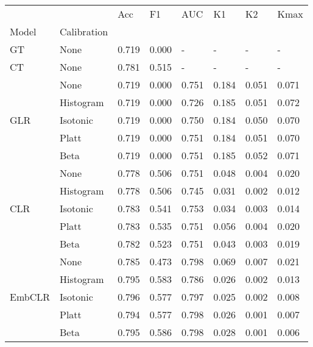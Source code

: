 \begin{tabular}{llllllll}
\toprule
 &  & Acc & F1 & AUC & K1 & K2 & Kmax \\
Model & Calibration &  &  &  &  &  &  \\
\midrule
GT & None & 0.719 & 0.000 & - & - & - & - \\
\cline{1-8}
CT & None & 0.781 & 0.515 & - & - & - & - \\
\cline{1-8}
\multirow[t]{5}{*}{GLR} & None & 0.719 & 0.000 & 0.751 & 0.184 & 0.051 & 0.071 \\
 & Histogram & 0.719 & 0.000 & 0.726 & 0.185 & 0.051 & 0.072 \\
 & Isotonic & 0.719 & 0.000 & 0.750 & 0.184 & 0.050 & 0.070 \\
 & Platt & 0.719 & 0.000 & 0.751 & 0.184 & 0.051 & 0.070 \\
 & Beta & 0.719 & 0.000 & 0.751 & 0.185 & 0.052 & 0.071 \\
\cline{1-8}
\multirow[t]{5}{*}{CLR} & None & 0.778 & 0.506 & 0.751 & 0.048 & 0.004 & 0.020 \\
 & Histogram & 0.778 & 0.506 & 0.745 & 0.031 & 0.002 & 0.012 \\
 & Isotonic & 0.783 & 0.541 & 0.753 & 0.034 & 0.003 & 0.014 \\
 & Platt & 0.783 & 0.535 & 0.751 & 0.056 & 0.004 & 0.020 \\
 & Beta & 0.782 & 0.523 & 0.751 & 0.043 & 0.003 & 0.019 \\
\cline{1-8}
\multirow[t]{5}{*}{EmbCLR} & None & 0.785 & 0.473 & 0.798 & 0.069 & 0.007 & 0.021 \\
 & Histogram & 0.795 & 0.583 & 0.786 & 0.026 & 0.002 & 0.013 \\
 & Isotonic & 0.796 & 0.577 & 0.797 & 0.025 & 0.002 & 0.008 \\
 & Platt & 0.794 & 0.577 & 0.798 & 0.026 & 0.001 & 0.007 \\
 & Beta & 0.795 & 0.586 & 0.798 & 0.028 & 0.001 & 0.006 \\
\cline{1-8}
\bottomrule
\end{tabular}
